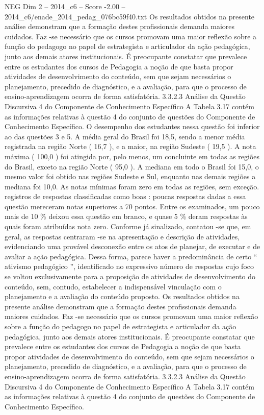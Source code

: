 \begin{textsample}{NEG Dim 2 – 2014\_c6 – Score -2.00 – 2014\_c6/enade\_2014\_pedag\_076bc59f40.txt}
Os resultados obtidos na presente análise demonstram que a formação destes profissionais demanda maiores cuidados.
Faz -se necessário que os cursos promovam uma maior reflexão sobre a função do pedagogo no papel de estrategista e articulador da ação pedagógica, junto aos demais atores institucionais.
É preocupante constatar que prevalece entre os estudantes dos cursos de Pedagogia a noção de que basta propor atividades de desenvolvimento do conteúdo, sem que sejam necessários o planejamento, precedido de diagnóstico, e a avaliação, para que o processo de ensino-aprendizagem ocorra de forma satisfatória. 3.3.2.3 Análise da Questão Discursiva 4 do Componente de Conhecimento Específico A Tabela 3.17 contém as informações relativas à questão 4 do conjunto de questões do Componente de Conhecimento Específico.
O desempenho dos estudantes nessa questão foi inferior ao das questões 3 e 5.
A média geral do Brasil foi 18,5, sendo a menor média registrada na região Norte ( 16,7 ), e a maior, na região Sudeste ( 19,5 ).
A nota máxima ( 100,0 ) foi atingida por, pelo menos, um concluinte em todas as regiões do Brasil, exceto na região Norte ( 95,0 ).
A mediana em todo o Brasil foi 15,0, o mesmo valor foi obtido nas regiões Sudeste e Sul, enquanto nas demais regiões a mediana foi 10,0.
As notas mínimas foram zero em todas as regiões, sem exceção. registros de respostas classificadas como boas : poucas respostas dadas a essa questão mereceram notas superiores a 70 pontos.
Entre os examinados, um pouco mais de 10 \% deixou essa questão em branco, e quase 5 \% deram respostas às quais foram atribuídas nota zero.
Conforme já sinalizado, contatou -se que, em geral, as respostas centraram -se na apresentação e descrição de atividades, evidenciando uma provável desconexão entre os atos de planejar, de executar e de avaliar a ação pedagógica.
Dessa forma, parece haver a predominância de certo “ ativismo pedagógico ”, identificado no expressivo número de respostas cujo foco se voltou exclusivamente para a proposição de atividades de desenvolvimento do conteúdo, sem, contudo, estabelecer a indispensável vinculação com o planejamento e a avaliação do conteúdo proposto.
Os resultados obtidos na presente análise demonstram que a formação destes profissionais demanda maiores cuidados.
Faz -se necessário que os cursos promovam uma maior reflexão sobre a função do pedagogo no papel de estrategista e articulador da ação pedagógica, junto aos demais atores institucionais.
É preocupante constatar que prevalece entre os estudantes dos cursos de Pedagogia a noção de que basta propor atividades de desenvolvimento do conteúdo, sem que sejam necessários o planejamento, precedido de diagnóstico, e a avaliação, para que o processo de ensino-aprendizagem ocorra de forma satisfatória. 3.3.2.3 Análise da Questão Discursiva 4 do Componente de Conhecimento Específico A Tabela 3.17 contém as informações relativas à questão 4 do conjunto de questões do Componente de Conhecimento Específico.

\end{textsample}

